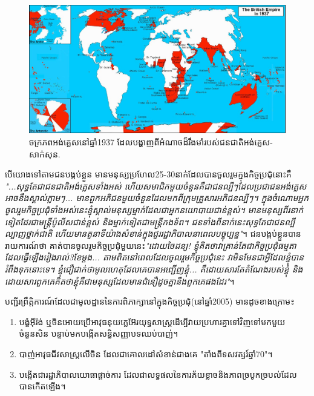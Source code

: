 \documentclass[10pt,twocolumn,letterpaper]{article}
\begin{document}
\begin{figure}[t]
\begin{center}
\includegraphics[width=1\textwidth]{british.jpg}
\end{center}
   \caption{ចក្រភពអង់គ្លេសនៅឆ្នាំ1937 ដែលបង្ហាញពីអំណាចដ៏រឹងមាំរបស់ជនជាតិអង់គ្លេស-សាក់សុន\cite{14}.}
   \label{fig:2}
\end{figure}
	បើយោងទៅតាមជនបង្កប់ខ្លួន មានមនុស្សប្រហែល25-30នាក់ដែលបានចូលរួមក្នុងកិច្ចប្រជុំនោះគឺ \textit{"...សុទ្ធតែជាជនជាតិអង់គ្លេសទាំងអស់ ហើយសមាជិកមួយចំនួនគឺជាជនល្បីៗដែលប្រជាជនអង់គ្លេសអាចនឹងស្គាល់ភ្លាមៗ... មានពួកអភិជនមួយចំនួនដែលមកពីក្រុមគ្រួសារអភិជនល្បីៗ។ ក្នុងចំណោមអ្នកចូលរួមកិច្ចប្រជុំទាំងអស់នេះ​ ខ្ញុំស្គាល់មនុស្សម្នាក់ដែលជាអ្នកនយោបាយជាន់ខ្ពស់។ មានមនុស្សពីរនាក់ទៀតដែរជាមន្ត្រីប៉ូលីសជាន់ខ្ពស់ និងម្នាក់ទៀតជាមន្ត្រីកងទ័ព។ ជនទាំងពីនាក់នេះសុទ្ធតែជាជនល្បីល្បាញថ្នាក់ជាតិ ហើយមានតួនាទីយ៉ាងសំខាន់ក្នុងជួររដ្ឋាភិបាលនាពេលបច្ចុប្បន្ន"}\cite{4}។ ជនបង្កប់ខ្លួនបានរាយការណ៍ថា គាត់បានចូលរួមកិច្ចប្រជុំមួយនេះ\textit {"ដោយចៃដន្យ! ខ្ញុំគិតថាវាគ្រាន់តែជាកិច្ចប្រជុំធម្មតាដែលធ្វើឡើងរៀងរាល់3ខែម្តង... តាមពិតនៅពេលដែលចូលរួមកិច្ចប្រជុំនេះ វាមិនមែនជាអ្វីដែលខ្ញុំ​បានរំពឹងទុកនោះទេ។ ខ្ញុំជឿជាក់ថាមូលហេតុដែលគេបានអញ្ជើញខ្ញុំ... គឺដោយសារតែតំណែងរបស់ខ្ញុំ និងដោយសារពួកគេគិតថាខ្ញុំគឺជាមនុស្សដែលមានជំនឿដូចគ្នានឹងពួកគេផងដែរ"}\cite{4}។

បញ្ជីរព្រឹត្តិការណ៍ដែលជាមូលដ្ឋាននៃការពិភាក្សានៅក្នុងកិច្ចប្រជុំ(នៅឆ្នាំ2005) មានដូចខាងក្រោម៖

\begin{flushleft}
\begin{enumerate}
    \item បង្ខំអុីរ៉ង់ ឬចិនអោយប្រើអាវុធនុយក្លេអ៊ែរយុទ្ធសាស្ត្រដើម្បីវាយប្រហារគ្នាទៅវិញទៅមកមួយចំនួនសិន បន្ទាប់មកបង្កើតសន្ធិសញ្ញាបទឈប់បាញ់។
    \item បាញ់អាវុធជីវសាស្ត្រលើចិន ដែលជាគោលដៅសំខាន់ជាងគេ "តាំងពីទសវត្សរ៍ឆ្នាំ70"។
    \item បង្កើតជារដ្ឋាភិបាលយោធាផ្តាច់ការ ដែលជាលទ្ធផលនៃការភ័យខ្លាចនិងភាពច្របូកច្របល់ដែលបានកើតឡើង។
\end{enumerate}
\end{flushleft}
\end{document}
